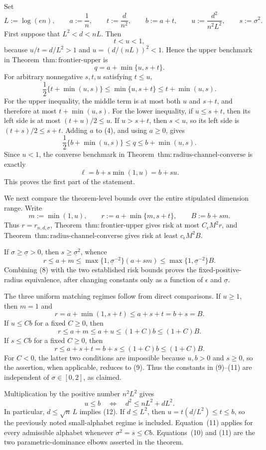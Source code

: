 Set
\[
 L:=\log(en),\qquad a:=\frac1n,\qquad t:=\frac d{n^2},
 \qquad b:=a+t,\qquad u:=\frac{d^2}{n^2L^2},
 \qquad s:=\sigma^2.
\tag{1}
\]
First suppose that \(L^2<d<nL\).  Then
\[
 t<u<1,
\tag{2}
\]
because \(u/t=d/L^2>1\) and \(u=(d/(nL))^2<1\).  Hence the upper benchmark in Theorem~\(\mathrm{thm:frontier\text{-}upper}\) is
\[
 q=a+\min\{u,s+t\}.
\tag{3}
\]
For arbitrary nonnegative \(s,t,u\) satisfying \(t\le u\),
\[
 \frac12\{t+\min(u,s)\}
 \le \min\{u,s+t\}
 \le t+\min(u,s).
\tag{4}
\]
For the upper inequality, the middle term is at most both \(u\) and \(s+t\), and therefore at most \(t+\min(u,s)\).  For the lower inequality, if \(u\le s+t\), then its left side is at most \((t+u)/2\le u\).  If \(u>s+t\), then \(s<u\), so its left side is \((t+s)/2\le s+t\).  Adding \(a\) to (4), and using \(a\ge0\), gives
\[
 \frac12\{b+\min(u,s)\}
 \le q\le b+\min(u,s).
\tag{5}
\]
Since \(u<1\), the converse benchmark in Theorem~\(\mathrm{thm:radius\text{-}channel\text{-}converse}\) is exactly
\[
 \ell=b+s\min(1,u)=b+su.
\tag{6}
\]
This proves the first part of the statement.

We next compare the theorem-level bounds over the entire stipulated dimension range.  Write
\[
 m:=\min(1,u),\qquad
 r:=a+\min\{m,s+t\},\qquad
 B:=b+sm.
\tag{7}
\]
Thus \(r=r_{n,d,\sigma}\), Theorem~\(\mathrm{thm:frontier\text{-}upper}\) gives risk at most \(C_\epsilon M^2r\), and Theorem~\(\mathrm{thm:radius\text{-}channel\text{-}converse}\) gives risk at least \(c_\epsilon M^2B\).

If \(\sigma\ge\underline\sigma>0\), then \(s\ge\underline\sigma^2\), whence
\[
 r\le a+m
 \le \max\{1,\underline\sigma^{-2}\}(a+sm)
 \le \max\{1,\underline\sigma^{-2}\}B.
\tag{8}
\]
Combining (8) with the two established risk bounds proves the fixed-positive-radius equivalence, after changing constants only as a function of \(\epsilon\) and \(\underline\sigma\).

The three uniform matching regimes follow from direct comparisons.  If \(u\ge1\), then \(m=1\) and
\[
 r=a+\min(1,s+t)\le a+s+t=b+s=B.
\tag{9}
\]
If \(u\le Cb\) for a fixed \(C\ge0\), then
\[
 r\le a+m\le a+u\le(1+C)b\le(1+C)B.
\tag{10}
\]
If \(s\le Cb\) for a fixed \(C\ge0\), then
\[
 r\le a+s+t=b+s\le(1+C)b\le(1+C)B.
\tag{11}
\]
For \(C<0\), the latter two conditions are impossible because \(u,b>0\) and \(s\ge0\), so the assertion, when applicable, reduces to (9).  Thus the constants in (9)--(11) are independent of \(\sigma\in[0,2]\), as claimed.

Multiplication by the positive number \(n^2L^2\) gives
\[
 u\le b
 \quad\Longleftrightarrow\quad
 d^2\le nL^2+dL^2.
\tag{12}
\]
In particular, \(d\le\sqrt n\,L\) implies (12).  If \(d\le L^2\), then \(u=t(d/L^2)\le t\le b\), so the previously noted small-alphabet regime is included.  Equation~(11) applies for every admissible alphabet whenever \(\sigma^2=s\le Cb\).  Equations~(10) and (11) are the two parametric-dominance elbows asserted in the theorem.

